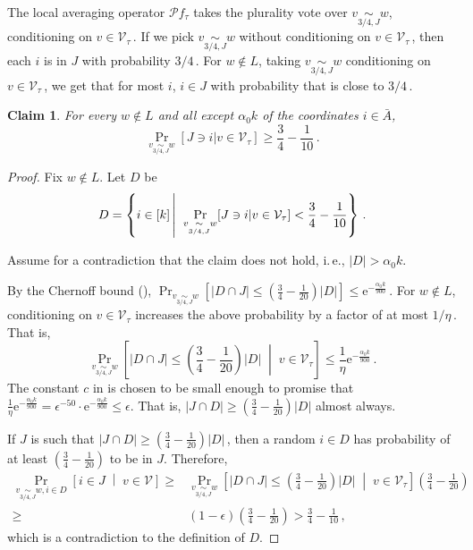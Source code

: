 \documentclass[11pt]{article}
\numberwithin{equation}{section}
\newtheorem{claim}[theorem]{Claim}
\theoremstyle{definition}
\theoremstyle{plain}
\newcommand{\eee}{\mathrm e}
\newcommand{\ie}{i.\,e.}
\newcommand{\Prob}[2][]{\Pr_{{#1}}\left[#2\right]} %
\newcommand{\Paren}[1]{\left(#1\right)} %
\newcommand{\abs}[1]{\lvert#1\rvert} %
\newcommand{\given}{\;\middle\vert\;} %
\newcommand\sett[2]{\left\{ #1 \left| \; \vphantom{#1 #2} \right. #2  \right\}} %
\newcommand\f{f} %
\newcommand\bh{\mathcal{P}\f_\tau} %
\newcommand\cons{\mathcal{V}} %
\newcommand\cor[1]{\underset{\scriptscriptstyle#1}{\sim}} %
\newcommand\rest[1]{{\bar{#1}}}  %
\def\eps{\epsilon}
\begin{document}
The local averaging operator $\bh$ takes the plurality vote over $v\cor{3/4,J}w$, conditioning on $v\in \cons_\tau$\,. If we pick $v\cor{3/4,J}w$ without conditioning on $v\in\cons_\tau$\,, then each $i$ is in $J$ with probability 
%
$3/4$\,. %
 For $w\notin L$, taking $v\cor{3/4,J}w$ conditioning on $v\in\cons_\tau$\,, we get that for most $i$, $i\in J$ with probability that is close to 
%
$3/4$\,. %
\begin{claim}\label{claim:almost 3 over 4}
   For every $w\notin L$ and all except $\alpha_0 k$ of the coordinates $i\in\rest{A}$,
   \[ \Pr_{v\cor{3/4,J}w}[J\ni i | v\in\cons_\tau] \geq \frac{3}{4}-\frac{1}{10}\,. \]%
\end{claim}
\begin{proof}
    Fix $w\notin L$. Let $D$ be
    \[ D = \sett{i\in [k]}{\Pr_{v\cor{3/4,J}w}[J\ni i | v\in\cons_\tau] < \frac{3}{4}-\frac{1}{10}}\,.\] %
    
Assume %
for  %
a contradiction that the claim does not hold, \ie, $\abs{D} > \alpha_0 k$.
    
%
%
%
%
%
By the Chernoff bound (), %
$\Prob[v\cor{3/4,J}w]{\abs{D\cap J} \leq \Paren{\frac{3}{4} - \frac{1}{20}}\abs{D}} 
    \leq \eee^{-\frac{\alpha_0 k}{900}}$\,.
    For $w\notin L$, conditioning on $v\in \cons_\tau$ increases the above probability by a factor of at most 
    $1/\eta$\,. %
    That is,
    \[ \Prob[v\cor{3/4,J}w]{\abs{D\cap J} \leq \Paren{\frac{3}{4} - \frac{1}{20}}\abs{D}\given v\in\cons_\tau} \leq \frac{1}{\eta} \eee^{-\frac{\alpha_0 k}{900}}\,.\]%
    The constant $c$ in is chosen to be small enough to promise that $\frac{1}{\eta} \eee^{-\frac{\alpha_0 k}{900}} = \eps^{-50}\cdot \eee^{-\frac{\alpha_0 k}{900}}\leq \epsilon$. That is, $\abs{J\cap D}\geq \Paren{\frac{3}{4} - \frac{1}{20}}\abs{D}$ almost always.
	
	If $J$ is such that $\abs{J\cap D}\geq \Paren{\frac{3}{4} - \frac{1}{20}}\abs{D}$\,, then a random $i\in D$ has probability of at least $\Paren{\frac{3}{4} - \frac{1}{20}}$ to be in $J$. Therefore,
	\begin{align*}
	   \Prob[v\cor{3/4,J}w,i\in D]{i\in J\given v\in\cons} \geq& \Prob[v\cor{3/4,J}w]{\abs{D\cap J} \leq \Paren{\frac{3}{4} - \frac{1}{20}}\abs{D}\given v\in\cons_\tau} \Paren{\frac{3}{4} - \frac{1}{20}}\\
	   \geq& (1-\epsilon)\Paren{\frac{3}{4} - \frac{1}{20}} > \frac{3}{4}-\frac{1}{10}\,, %
	\end{align*}
	which is a contradiction to the definition of $D$.
\end{proof}
\end{document}
